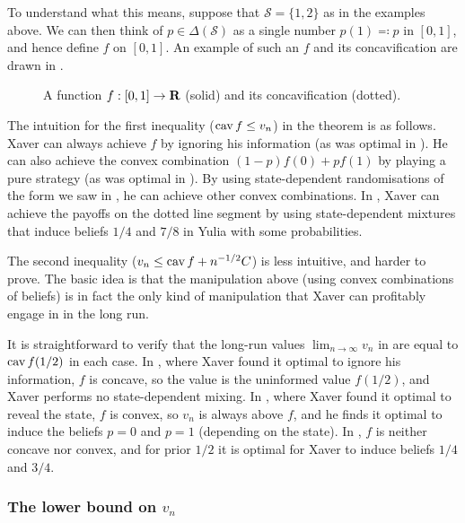 \documentclass[11pt,letterpaper,reqno,oneside]{article}
\begin{document}
To understand what this means, suppose that $\mathcal{S} = \{1,2\}$ as in the examples above. We can then think of $p \in \Delta(\mathcal{S})$ as a single number $p(1) \eqqcolon p$ in $[0,1]$, and hence define $f$ on $[0,1]$. An example of such an $f$ and its concavification are drawn in .
%
\begin{figure}
	\centering
	
	\caption{A function $f : [0,1] \to \mathbf{R}$ (solid) and its concavification (dotted).}
	\label{fig:cav}
\end{figure}


The intuition for the first inequality ($\operatorname*{cav} f \leq v_n$) in the theorem is as follows. Xaver can always achieve $f$ by ignoring his information (as was optimal in ). He can also achieve the convex combination $(1-p) f(0) + p f(1)$ by playing a pure strategy (as was optimal in ). By using state-dependent randomisations of the form we saw in , he can achieve other convex combinations. In , Xaver can achieve the payoffs on the dotted line segment by using state-dependent mixtures that induce beliefs $1/4$ and $7/8$ in Yulia with some probabilities.

The second inequality ($v_n \leq \operatorname*{cav} f + n^{-1/2} C$) is less intuitive, and harder to prove. The basic idea is that the manipulation above (using convex combinations of beliefs) is in fact the only kind of manipulation that Xaver can profitably engage in in the long run.

It is straightforward to verify that the long-run values $\lim_{n \to \infty} v_n$ in  are equal to $\operatorname*{cav} f(1/2)$ in each case. In , where Xaver found it optimal to ignore his information, $f$ is concave, so the value is the uninformed value $f(1/2)$, and Xaver performs no state-dependent mixing. In , where Xaver found it optimal to reveal the state, $f$ is convex, so $v_n$ is always above $f$, and he finds it optimal to induce the beliefs $p=0$ and $p=1$ (depending on the state). In , $f$ is neither concave nor convex, and for prior $1/2$ it is optimal for Xaver to induce beliefs $1/4$ and $3/4$.



\subsubsection{The lower bound on \texorpdfstring{$v_n$}{vn}}
\label{sec:learning:AumannMaschler:first_ineq}
\end{document}
